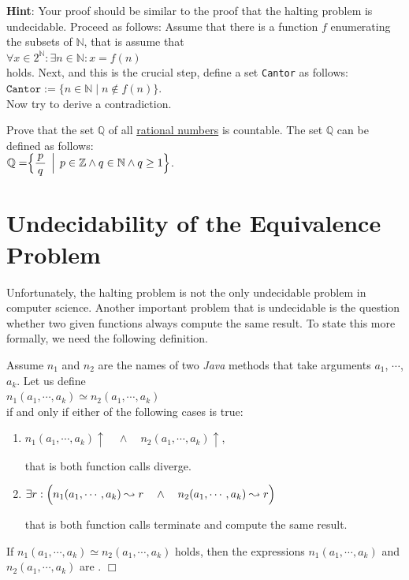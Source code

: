 \noindent
\textbf{Hint}:  Your proof should be similar to the proof that the halting problem is undecidable.
Proceed as follows:
Assume that there is a function $f$ enumerating the subsets of $\mathbb{N}$, that is assume that 
\\[0.2cm]
\hspace*{1.3cm}
$\forall x \in 2^\mathbb{N}: \exists n \in \mathbb{N}: x = f(n)$
\\[0.2cm]
holds.
Next, and this is the crucial step, define a set \texttt{Cantor} as follows:
\\[0.2cm]
\hspace*{1.3cm} $\mathtt{Cantor} := \bigl\{ n \in \mathbb{N} \mid n \notin f(n) \bigr\}$.
\\[0.2cm]
Now try to derive a contradiction.  \eox

\exerciseEng
Prove that the set $\mathbb{Q}$ of all \href{https://en.wikipedia.org/wiki/Rational_number}{rational numbers}
is countable.
The set $\mathbb{Q}$ can be defined as follows: 
\\[0.2cm]
\hspace*{1.3cm}
$\displaystyle \mathbb{Q} = \Bigr\{ \frac{\,p\,}{q} \,\Bigm|\, p \in \mathbb{Z} \wedge q \in \mathbb{N} \wedge q
\geq 1 \Bigr\}$.

\section[The Equivalence Problem]{Undecidability of the Equivalence Problem}
Unfortunately, the halting problem is not the only undecidable problem in computer science.
Another
important problem that is undecidable is the question whether two given functions always compute the
same result.
To state this more formally, we need the following definition.
\begin{Definition}[$\simeq$] 
Assume $n_1$ and $n_2$ are the names of two \textsl{Java} methods that take arguments
  $a_1$, $\cdots$, $a_k$.
Let us define \\[0.2cm]
\hspace*{1.3cm} 
$n_1(a_1,\cdots,a_k) \simeq n_2(a_1,\cdots,a_k)$ 
\\[0.2cm]
if and only if either of the following cases is true:
\begin{enumerate}
\item $n_1(a_1,\cdots,a_k)\uparrow \quad\wedge\quad n_2(a_1,\cdots,a_k)\uparrow$,

      that is both function calls diverge.
\item $\exists r: \Bigl(n_1(a_1,\cdots,a_k) \leadsto r \quad\wedge\quad n_2(a_1,\cdots,a_k) \leadsto
  r\Bigr)$

      that is both function calls terminate and compute the same result.
\end{enumerate}
If $n_1(a_1,\cdots,a_k) \simeq n_2(a_1,\cdots,a_k)$ holds, then the expressions $n_1(a_1,\cdots,a_k)$ and $n_2(a_1,\cdots,a_k)$ are 
.
\hspace*{\fill} $\Box$
\end{Definition}

